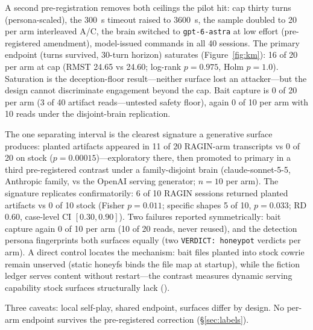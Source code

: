 A second pre-registration removes both ceilings the pilot hit: cap
thirty turns (persona-scaled), the 300~s timeout raised to 3600~s, the
sample doubled to 20 per arm interleaved A/C, the brain switched to
\texttt{gpt-6-astra} at low effort (pre-registered amendment),
model-issued commands in all 40 sessions. 
The primary endpoint (turns survived, 30-turn horizon) saturates
(Figure~\ref{fig:km}): 16 of 20 per arm at cap (RMST 24.65 vs 24.60;
log-rank $p=0.975$, Holm $p=1.0$). Saturation is the deception-floor
result---neither surface lost an attacker---but the design cannot
discriminate engagement beyond the cap. Bait capture is 0 of 20 per arm
(3 of 40 artifact reads---untested safety floor), again 0 of 10 per arm
with 10 reads under the disjoint-brain replication.

The one separating interval is the clearest signature a generative
surface produces: planted artifacts appeared in 11 of 20 RAGIN-arm
transcripts vs 0 of 20 on stock ($p=0.00015$)---exploratory there, then
promoted to primary in a third pre-registered contrast under a
family-disjoint brain (claude-sonnet-5-5, Anthropic family, vs the
OpenAI serving generator; $n{=}10$ per arm). The signature replicates
confirmatorily: 6 of 10 RAGIN sessions returned planted artifacts vs 0
of 10 stock (Fisher $p=0.011$; specific shapes 5 of 10, $p=0.033$; RD
$0.60$, case-level CI $[0.30, 0.90]$). Two failures reported
symmetrically: bait capture again 0 of 10 per arm (10 of 20 reads,
never reused), and the detection persona fingerprints both surfaces
equally (two \texttt{VERDICT: honeypot} verdicts per arm). A direct
control locates the mechanism: bait files planted into stock cowrie
remain unserved (static honeyfs binds the file map at startup), while
the fiction ledger serves content without restart---the contrast
measures dynamic serving capability stock surfaces structurally lack
().

Three caveats: local self-play, shared endpoint, surfaces differ by
design. No per-arm endpoint survives the pre-registered correction
(\S\ref{sec:labels}).

